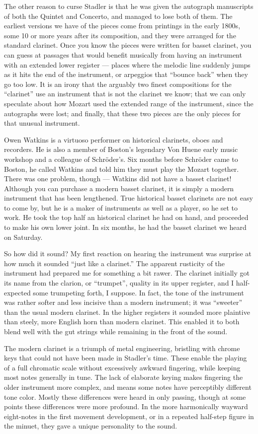 The other reason to curse Stadler is that he was given the autograph manuscripts of both the Quintet and Concerto, and managed to lose both of them. The earliest versions we have of the pieces come from printings in the early 1800s, some 10 or more years after its composition, and they were arranged for the standard clarinet. Once you know the pieces were written for basset clarinet, you can guess at passages that would benefit musically from having an instrument with an extended lower register — places where the melodic line suddenly jumps as it hits the end of the instrument, or arpeggios that “bounce back” when they go too low. It is an irony that the arguably two finest compositions for the “clarinet” use an instrument that is not the clarinet we know; that we can only speculate about how Mozart used the extended range of the instrument, since the autographs were lost; and finally, that these two pieces are the only pieces for that unusual instrument.

Owen Watkins is a virtuoso performer on historical clarinets, oboes and recorders. He is also a member of Boston’s legendary Von Huene early music workshop and a colleague of Schröder’s. Six months before Schröder came to Boston, he called Watkins and told him they must play the Mozart together. There was one problem, though — Watkins did not have a basset clarinet! Although you can purchase a modern basset clarinet, it is simply a modern instrument that has been lengthened. True historical basset clarinets are not easy to come by, but he is a maker of instruments as well as a player, so he set to work. He took the top half an historical clarinet he had on hand, and proceeded to make his own lower joint. In six months, he had the basset clarinet we heard on Saturday.

So how did it sound? My first reaction on hearing the instrument was surprise at how much it sounded “just like a clarinet.” The apparent rusticity of the instrument had prepared me for something a bit rawer. The clarinet initially got its name from the clarion, or “trumpet”, quality in its upper register, and I half-expected some trumpeting forth, I suppose. In fact, the tone of the instrument was rather softer and less incisive than a modern instrument; it was “sweeter” than the usual modern clarinet. In the higher registers it sounded more plaintive than steely, more English horn than modern clarinet. This enabled it to both blend well with the gut strings while remaining in the front of the sound.

The modern clarinet is a triumph of metal engineering, bristling with chrome keys that could not have been made in Stadler’s time. These enable the playing of a full chromatic scale without excessively awkward fingering, while keeping most notes generally in tune. The lack of elaborate keying makes fingering the older instrument more complex, and means some notes have perceptibly different tone color. Mostly these differences were heard in only passing, though at some points these differences were more profound. In the more harmonically wayward eight-notes in the first movement development, or in a repeated half-step figure in the minuet, they gave a unique personality to the sound.

